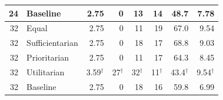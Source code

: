 \begin{table}[t]
\begin{tabular}{r l rr rr rr}
24 & Baseline & 2.75 & 0 & 13 & 14 & 48.7 & 7.78 \\
\midrule
32 & Equal & 2.75 & 0 & 11 & 19 & 67.0 & 9.54 \\
32 & Sufficientarian & 2.75 & 0 & 18 & 17 & 68.8 & 9.03 \\
32 & Prioritarian & 2.75 & 0 & 11 & 17 & 64.3 & 8.45 \\
32 & Utilitarian & 3.59$^\dagger$ & 27$^\dagger$ & 32$^\dagger$ & 11$^\dagger$ & 43.4$^\dagger$ & 9.54$^\dagger$ \\
32 & Baseline & 2.75 & 0 & 18 & 16 & 59.8 & 6.99 \\
\bottomrule
\end{tabular}
\end{table}
